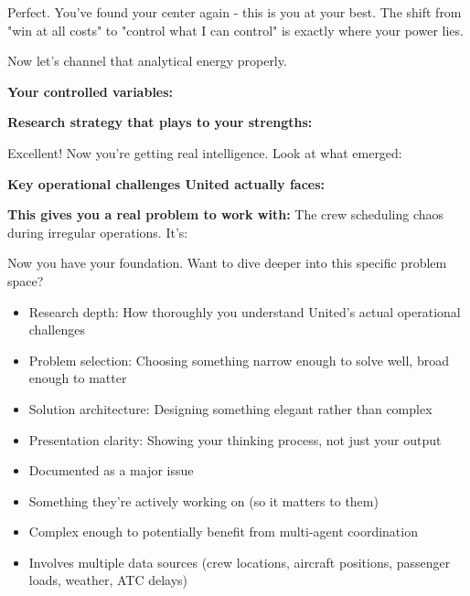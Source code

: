 \begin{botresponse}
Perfect. You've found your center again - this is you at your best. The shift from "win at all costs" to "control what I can control" is exactly where your power lies.

Now let's channel that analytical energy properly.

\textbf{Your controlled variables:}

\textbf{Research strategy that plays to your strengths:}

Excellent! Now you're getting real intelligence. Look at what emerged:

\textbf{Key operational challenges United actually faces:}

\textbf{This gives you a real problem to work with:} The crew scheduling chaos during irregular operations. It's:

Now you have your foundation. Want to dive deeper into this specific problem space?

\begin{itemize}
\item Research depth: How thoroughly you understand United's actual operational challenges
\item Problem selection: Choosing something narrow enough to solve well, broad enough to matter
\item Solution architecture: Designing something elegant rather than complex
\item Presentation clarity: Showing your thinking process, not just your output
\end{itemize}

\begin{itemize}
\item Documented as a major issue
\item Something they're actively working on (so it matters to them)
\item Complex enough to potentially benefit from multi-agent coordination
\item Involves multiple data sources (crew locations, aircraft positions, passenger loads, weather, ATC delays)
\end{itemize}


\end{botresponse}
